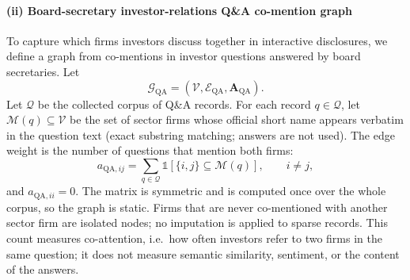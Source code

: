 \documentclass[pdflatex,sn-mathphys-num]{sn-jnl}%
\theoremstyle{thmstyleone}%
\theoremstyle{thmstyletwo}%
\theoremstyle{thmstylethree}%
\begin{document}
\paragraph{(ii) Board-secretary investor-relations Q\&A co-mention graph}
{\color{blue}To capture which firms investors discuss together in interactive disclosures, we define a graph from co-mentions in investor questions answered by board secretaries.
Let
\begin{equation}
\mathcal{G}_{\mathrm{QA}}=(\mathcal{V},\mathcal{E}_{\mathrm{QA}},\mathbf{A}_{\mathrm{QA}}).
\end{equation}
Let $\mathcal{Q}$ be the collected corpus of Q\&A records. For each record $q\in\mathcal{Q}$, let $\mathcal{M}(q)\subseteq\mathcal{V}$ be the set of sector firms whose official short name appears verbatim in the question text (exact substring matching; answers are not used). The edge weight is the number of questions that mention both firms:
\begin{equation}
a_{\mathrm{QA},ij}=\sum_{q\in\mathcal{Q}}\mathbb{1}\left[\{i,j\}\subseteq\mathcal{M}(q)\right],\qquad i\neq j,
\label{eq:aqa_def}
\end{equation}
and $a_{\mathrm{QA},ii}=0$. The matrix is symmetric and is computed once over the whole corpus, so the graph is static. Firms that are never co-mentioned with another sector firm are isolated nodes; no imputation is applied to sparse records. This count measures co-attention, i.e.\ how often investors refer to two firms in the same question; it does not measure semantic similarity, sentiment, or the content of the answers.\par}
\end{document}
